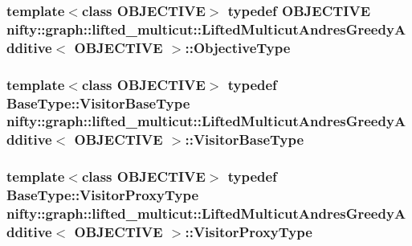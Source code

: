 \subsubsection[{Objective\+Type}]{\setlength{\rightskip}{0pt plus 5cm}template$<$class O\+B\+J\+E\+C\+T\+I\+V\+E$>$ typedef O\+B\+J\+E\+C\+T\+I\+V\+E {\bf nifty\+::graph\+::lifted\+\_\+multicut\+::\+Lifted\+Multicut\+Andres\+Greedy\+Additive}$<$ O\+B\+J\+E\+C\+T\+I\+V\+E $>$\+::{\bf Objective\+Type}}\label{classnifty_1_1graph_1_1lifted__multicut_1_1LiftedMulticutAndresGreedyAdditive_aad174abbd547a6779d21b2707261ce91}
\hypertarget{classnifty_1_1graph_1_1lifted__multicut_1_1LiftedMulticutAndresGreedyAdditive_a4531913f0d3f10d228ee28cb983f668c}{}
\subsubsection[{Visitor\+Base\+Type}]{\setlength{\rightskip}{0pt plus 5cm}template$<$class O\+B\+J\+E\+C\+T\+I\+V\+E$>$ typedef {\bf Base\+Type\+::\+Visitor\+Base\+Type} {\bf nifty\+::graph\+::lifted\+\_\+multicut\+::\+Lifted\+Multicut\+Andres\+Greedy\+Additive}$<$ O\+B\+J\+E\+C\+T\+I\+V\+E $>$\+::{\bf Visitor\+Base\+Type}}\label{classnifty_1_1graph_1_1lifted__multicut_1_1LiftedMulticutAndresGreedyAdditive_a4531913f0d3f10d228ee28cb983f668c}
\hypertarget{classnifty_1_1graph_1_1lifted__multicut_1_1LiftedMulticutAndresGreedyAdditive_aa365becac68b1dea378e889f964b80d8}{}
\subsubsection[{Visitor\+Proxy\+Type}]{\setlength{\rightskip}{0pt plus 5cm}template$<$class O\+B\+J\+E\+C\+T\+I\+V\+E$>$ typedef {\bf Base\+Type\+::\+Visitor\+Proxy\+Type} {\bf nifty\+::graph\+::lifted\+\_\+multicut\+::\+Lifted\+Multicut\+Andres\+Greedy\+Additive}$<$ O\+B\+J\+E\+C\+T\+I\+V\+E $>$\+::{\bf Visitor\+Proxy\+Type}}\label{classnifty_1_1graph_1_1lifted__multicut_1_1LiftedMulticutAndresGreedyAdditive_aa365becac68b1dea378e889f964b80d8}


